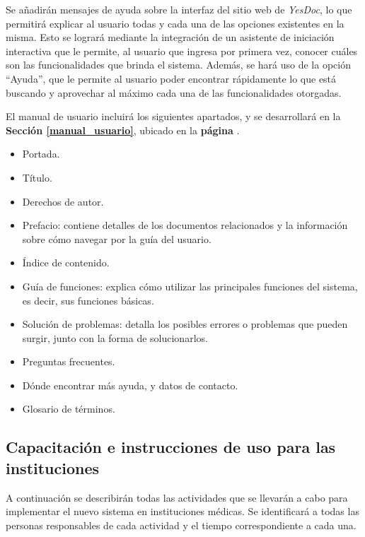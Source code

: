 \documentclass[a4paper,12pt]{article}
\begin{document}
Se añadirán mensajes de ayuda sobre la interfaz del sitio web de \textit{YesDoc}, lo que permitirá explicar al usuario todas y cada una de las opciones existentes en la misma.
Esto se logrará mediante la integración de un asistente de iniciación interactiva que le permite, al usuario que ingresa por primera vez, conocer cuáles son las funcionalidades que brinda el sistema.
Además, se hará uso de la opción ``Ayuda'', que le permite al usuario poder encontrar rápidamente lo que está buscando y aprovechar al máximo cada una de las funcionalidades otorgadas.

El manual de usuario incluirá los siguientes apartados, y se desarrollará en la \textbf{Sección \ref{manual_usuario}}, ubicado en la \textbf{página \pageref{manual_usuario}}. %
    \begin{itemize}
        \item   Portada.
        \item   Título.
        \item   Derechos de autor.
        \item   Prefacio: contiene detalles de los documentos relacionados y la información sobre cómo navegar por la guía del usuario.
        \item   Índice de contenido.
        \item   Guía de funciones: explica cómo utilizar las principales funciones del sistema, es decir, sus funciones básicas.
        \item   Solución de problemas: detalla los posibles errores o problemas que pueden surgir, junto con la forma de solucionarlos.
        \item   Preguntas frecuentes.
        \item   Dónde encontrar más ayuda, y datos de contacto.
        \item   Glosario de términos. %

    \end{itemize}
    
\subsection{Capacitación e instrucciones de uso para las instituciones}

A continuación se describirán todas las actividades que se llevarán a cabo para implementar el nuevo sistema en instituciones médicas. Se identificará a todas las personas responsables de cada actividad  y el tiempo correspondiente a cada una. 
\end{document}
